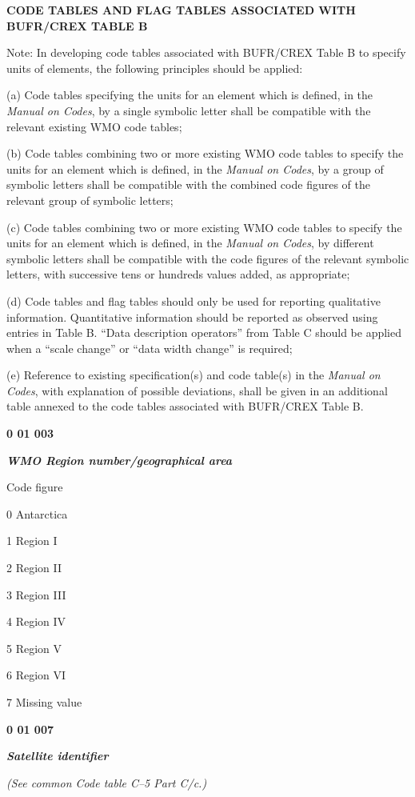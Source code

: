 \textbf{CODE TABLES AND FLAG TABLES ASSOCIATED WITH BUFR/CREX TABLE B}

Note: In developing code tables associated with BUFR/CREX Table B to specify units of elements, the following principles should be applied:

(a) Code tables specifying the units for an element which is defined, in the \emph{Manual on Codes}, by a single symbolic letter shall be compatible with the relevant existing WMO code tables;

(b) Code tables combining two or more existing WMO code tables to specify the units for an element which is defined, in the \emph{Manual on Codes}, by a group of symbolic letters shall be compatible with the combined code figures of the relevant group of symbolic letters;

(c) Code tables combining two or more existing WMO code tables to specify the units for an element which is defined, in the \emph{Manual on Codes}, by different symbolic letters shall be compatible with the code figures of the relevant symbolic letters, with successive tens or hundreds values added, as appropriate;

(d) Code tables and flag tables should only be used for reporting qualitative information. Quantitative information should be reported as observed using entries in Table B. ``Data description operators'' from Table C should be applied when a ``scale change'' or ``data width change'' is required;

(e) Reference to existing specification(s) and code table(s) in the \emph{Manual on Codes}, with explanation of possible deviations, shall be given in an additional table annexed to the code tables associated with BUFR/CREX Table B.

\textbf{0 01 003}

\emph{\textbf{WMO Region number/geographical area}}

Code figure

0 Antarctica

1 Region I

2 Region II

3 Region III

4 Region IV

5 Region V

6 Region VI

7 Missing value

\textbf{0 01 007}

\emph{\textbf{Satellite identifier}}

\emph{(See common Code table C--5 Part C/c.)}

